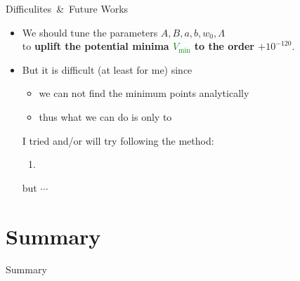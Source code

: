\documentclass[
  unicode,a4paper,10pt,
  xcolor = {dvipsnames,svgnames},
  hyperref ={colorlinks=true,citecolor=Navy,linkcolor=NavyBlue,urlcolor=purple},
  ja=standard,lualatex
]{beamer}
\renewcommand{\theequation}{\thesection.\arabic{equation}}
\renewcommand{\thefigure}{\thesection.\arabic{figure}}
\renewcommand{\thetable}{\thesection.\arabic{table}}
\begin{document}
\begin{frame}{Difficulites\ \&\ Future Works }

  \begin{itemize}
    \item 
    We should tune the parameters $A,B,a,b,w_{0},\Lambda$\\
    to \textbf{uplift the potential minima \textcolor{Green}{$V_{\mathrm{min}}$} to the order $+10^{-120}$}.

    \pause

    \item 
    But it is difficult (at least for me) since
    \begin{itemize}
      \item 
      we can not find the minimum points analytically
      \item 
      thus what we can do is only to 
    \end{itemize}

    \pause

    I tried and/or will try following the method:
    \begin{enumerate}
      \item 

    \end{enumerate}
    but $\cdots$


  \end{itemize}

\end{frame}


\section{Summary}


\begin{frame}{Summary}



\end{frame}



\setcounter{Appendix}{\value{framenumber}}
\setcounter{section}{0}
\renewcommand{\thesubsection}{\Alph{subsection}}
\makeatletter
\renewcommand{\theequation}{\thesubsection.\arabic{equation}}

\renewcommand{\thefigure}{\thesubsection.\arabic{figure}}

\renewcommand{\thetable}{\thesubsection.\arabic{table}}
\makeatother
\end{document}
